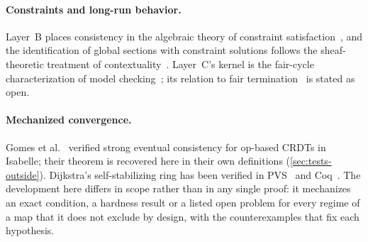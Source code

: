 \paragraph{Constraints and long-run behavior.}
Layer~B places consistency in the algebraic theory of constraint
satisfaction~\cite{jeavons1997,bulatov2017,zhuk2020}, and the identification of global sections with
constraint solutions follows the sheaf-theoretic treatment of contextuality~\cite{abramsky2011,
abramsky2014}. Layer~C's kernel is the fair-cycle characterization of model
checking~\cite{clarke1986,emersonlei1987,vardi1986}; its relation to fair
termination~\cite{lehmann1981,francez1986} is stated as open.

\paragraph{Mechanized convergence.}
Gomes et al.~\cite{gomes2017} verified strong eventual consistency for op-based CRDTs in Isabelle;
their theorem is recovered here in their own definitions (\cref{sec:tests-outside}). Dijkstra's
self-stabilizing ring has been verified in PVS~\cite{qadeer1998} and Coq~\cite{altisen2017}. The
development here differs in scope rather than in any single proof: it mechanizes an exact condition, a
hardness result or a listed open problem for every regime of a map that it does not exclude by design, with the counterexamples that fix
each hypothesis.
